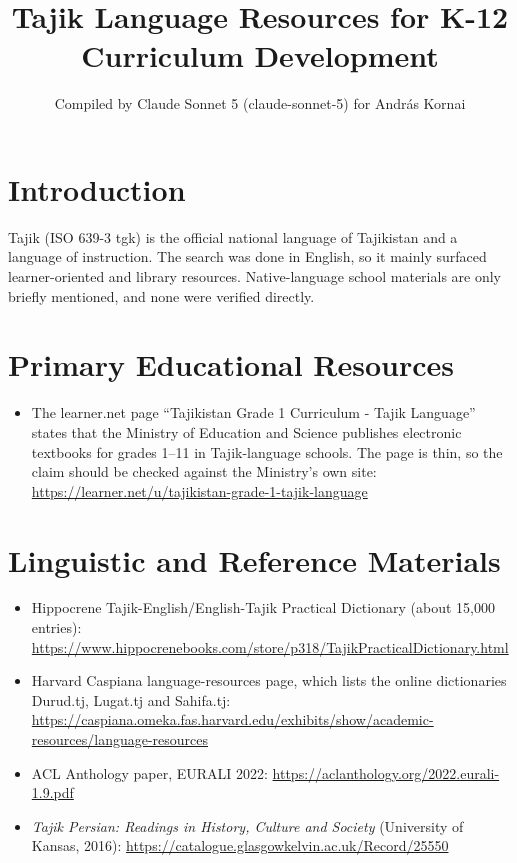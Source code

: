 \documentclass[12pt]{article}
\title{Tajik Language Resources for K-12 Curriculum Development}
\author{Compiled by Claude Sonnet 5 (claude-sonnet-5) for Andr\'as Kornai}
\date{}
\begin{document}
\maketitle

\section{Introduction}
Tajik (ISO 639-3 tgk) is the official national language of Tajikistan and a language of instruction. The search was done in English, so it mainly surfaced learner-oriented and library resources. Native-language school materials are only briefly mentioned, and none were verified directly.

\section{Primary Educational Resources}
\begin{itemize}
\item The learner.net page ``Tajikistan Grade 1 Curriculum - Tajik Language'' states that the Ministry of Education and Science publishes electronic textbooks for grades 1--11 in Tajik-language schools. The page is thin, so the claim should be checked against the Ministry's own site: \url{https://learner.net/u/tajikistan-grade-1-tajik-language}
\end{itemize}

\section{Linguistic and Reference Materials}
\begin{itemize}
\item Hippocrene Tajik-English/English-Tajik Practical Dictionary (about 15,000 entries): \url{https://www.hippocrenebooks.com/store/p318/TajikPracticalDictionary.html}
\item Harvard Caspiana language-resources page, which lists the online dictionaries Durud.tj, Lugat.tj and Sahifa.tj: \url{https://caspiana.omeka.fas.harvard.edu/exhibits/show/academic-resources/language-resources}
\item ACL Anthology paper, EURALI 2022: \url{https://aclanthology.org/2022.eurali-1.9.pdf}
\item \emph{Tajik Persian: Readings in History, Culture and Society} (University of Kansas, 2016): \url{https://catalogue.glasgowkelvin.ac.uk/Record/25550}
\end{itemize}
\end{document}
